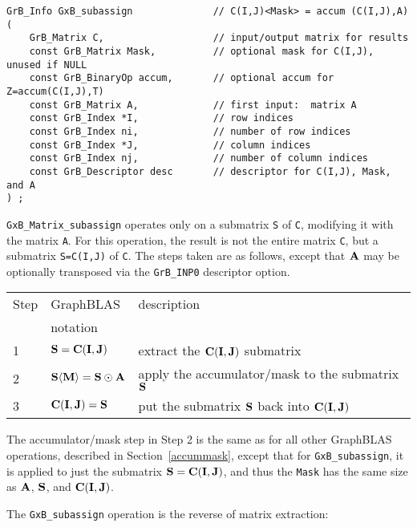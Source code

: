 \documentclass[12pt]{article}
\begin{document}
\begin{mdframed}[userdefinedwidth=6in]
{\footnotesize
\begin{verbatim}
GrB_Info GxB_subassign              // C(I,J)<Mask> = accum (C(I,J),A)
(
    GrB_Matrix C,                   // input/output matrix for results
    const GrB_Matrix Mask,          // optional mask for C(I,J), unused if NULL
    const GrB_BinaryOp accum,       // optional accum for Z=accum(C(I,J),T)
    const GrB_Matrix A,             // first input:  matrix A
    const GrB_Index *I,             // row indices
    const GrB_Index ni,             // number of row indices
    const GrB_Index *J,             // column indices
    const GrB_Index nj,             // number of column indices
    const GrB_Descriptor desc       // descriptor for C(I,J), Mask, and A
) ;
\end{verbatim} } \end{mdframed}

\verb'GxB_Matrix_subassign' operates only on a submatrix \verb'S' of \verb'C',
modifying it with the matrix \verb'A'.   For this operation, the result is not
the entire matrix \verb'C', but a submatrix \verb'S=C(I,J)' of \verb'C'.  The
steps taken are as follows, except that ${\bf A}$ may be optionally transposed
via the \verb'GrB_INP0' descriptor option.

\vspace{0.1in}
\begin{tabular}{lll}
\hline
Step & GraphBLAS & description \\
     & notation  & \\
\hline
1 & ${\bf S} = {\bf C(I,J)}$                             & extract the ${\bf C(I,J)}$ submatrix \\
2 & ${\bf S \langle M \rangle} = {\bf S} \odot {\bf A}$  & apply the accumulator/mask to the submatrix ${\bf S}$\\
3 & ${\bf C(I,J)}= {\bf S}$                              & put the submatrix ${\bf S}$ back into ${\bf C(I,J)}$ \\
\hline
\end{tabular}
\vspace{0.1in}

The accumulator/mask step in Step 2 is the same as for all other GraphBLAS
operations, described in Section~\ref{accummask}, except that for
\verb'GxB_subassign', it is applied to just the submatrix ${\bf S} = {\bf
C(I,J)}$, and thus the \verb'Mask' has the same size as ${\bf A}$,
${\bf S}$, and ${\bf C(I,J)}$.

The \verb'GxB_subassign' operation is the reverse of matrix extraction:
\end{document}
